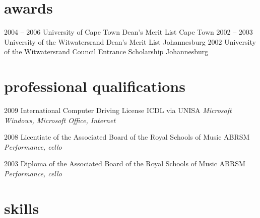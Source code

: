 \documentclass[]{friggeri-cv} %
\begin{document}
\section{awards}

\begin{entrylist}
\entry
{2004 -- 2006}
{University of Cape Town Dean's Merit List}
{Cape Town}
{}
\entry
{2002 -- 2003}
{University of the Witwatersrand Dean's Merit List}
{Johannesburg}
{}
\entry
{2002}
{University of the Witwatersrand Council Entrance Scholarship}
{Johannesburg}
{}
\end{entrylist}
\pagebreak

\section{professional qualifications}

\begin{entrylist}
\entry
{2009}
{International Computer Driving License}
{ICDL via UNISA}
{\emph{Microsoft Windows, Microsoft Office, Internet}}

\entry
{2008}
{Licentiate of the Associated Board of the Royal Schools of Music}
{ABRSM}
{\emph{Performance, cello}}

\entry
{2003}
{Diploma of the Associated Board of the Royal Schools of Music}
{ABRSM}
{\emph{Performance, cello}}

\end{entrylist}


\section{skills}
\end{document}

